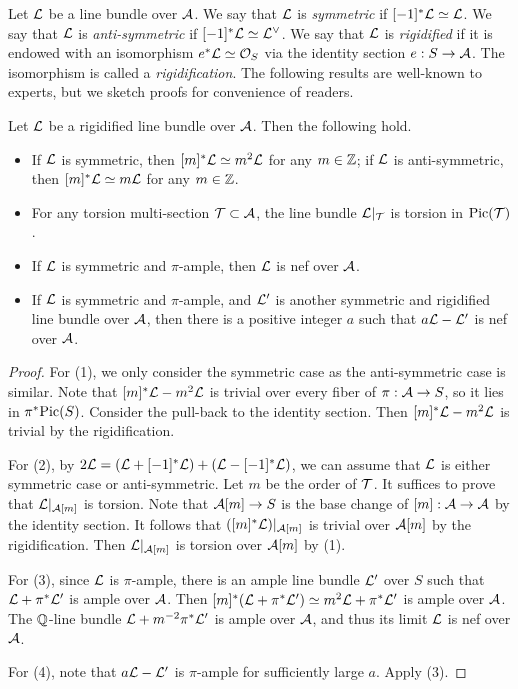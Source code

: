 Let ${\mathcal L}$ be a line bundle over ${\mathcal A}$.
We say that ${\mathcal L}$ is \emph{symmetric} if $[-1]^*{\mathcal L}\simeq {\mathcal L}$.
We say that ${\mathcal L}$ is \emph{anti-symmetric} if $[-1]^*{\mathcal L}\simeq {\mathcal L}^\vee$.
We say that ${\mathcal L}$ is \emph{rigidified} if it is endowed with an isomorphism $e^*{\mathcal L}\simeq {\mathcal O}_S$ via the identity section $e:S\to {\mathcal A}$. The isomorphism is called a \emph{rigidification}.
The following results are well-known to experts, but we sketch proofs for convenience of readers.

\begin{lemma}
\notready \label{line bundle}
Let ${\mathcal L}$ be a rigidified line bundle over ${\mathcal A}$.
Then the following hold.
\begin{itemize}
\item[(1)] If ${\mathcal L}$ is symmetric, then $[m]^*{\mathcal L}\simeq m^2{\mathcal L}$ for any $m\in {\mathbb Z}$; if ${\mathcal L}$ is anti-symmetric, then $[m]^*{\mathcal L}\simeq m{\mathcal L}$ for any $m\in {\mathbb Z}$.
\item[(2)] For any torsion multi-section ${\mathcal T}\subset {\mathcal A}$, the line bundle ${\mathcal L}|_{{\mathcal T}}$ is torsion in ${\rm Pic}({\mathcal T})$.
\item[(3)] If ${\mathcal L}$ is symmetric and $\pi$-ample, then ${\mathcal L}$ is nef over ${\mathcal A}$.
\item[(4)] If ${\mathcal L}$ is symmetric and $\pi$-ample, and ${\mathcal L}'$ is another symmetric and rigidified line bundle over ${\mathcal A}$, then there is a positive integer $a$ such that $a{\mathcal L}-{\mathcal L}'$ is nef over ${\mathcal A}$.
\end{itemize}
\end{lemma}

\begin{proof}
For (1), we only consider the symmetric case as the anti-symmetric case is similar.
Note that $[m]^*{\mathcal L}- m^2{\mathcal L}$ is trivial over every fiber of $\pi:{\mathcal A}\to S$, so it lies in $\pi^*{\rm Pic}(S)$. Consider the pull-back to the identity section. Then $[m]^*{\mathcal L}- m^2{\mathcal L}$ is trivial by the rigidification.

For (2), by $2{\mathcal L}=({\mathcal L}+[-1]^*{\mathcal L})+({\mathcal L}-[-1]^*{\mathcal L})$, we can assume that ${\mathcal L}$ is either symmetric case or anti-symmetric. Let $m$ be the order of ${\mathcal T}$. It suffices to prove that ${\mathcal L}|_{{\mathcal A}[m]}$ is torsion. Note that ${\mathcal A}[m]\to S$ is the base change of $[m]:{\mathcal A}\to {\mathcal A}$ by the identity section.
It follows that $([m]^*{\mathcal L})|_{{\mathcal A}[m]}$ is trivial over ${\mathcal A}[m]$ by the rigidification.
Then ${\mathcal L}|_{{\mathcal A}[m]}$ is torsion over ${\mathcal A}[m]$ by (1).

For (3), since ${\mathcal L}$ is $\pi$-ample, there is an ample line bundle ${\mathcal L}'$ over $S$ such that ${\mathcal L}+\pi^*{\mathcal L}'$ is ample over ${\mathcal A}$.
Then $[m]^*({\mathcal L}+\pi^*{\mathcal L}')\simeq m^2{\mathcal L}+\pi^*{\mathcal L}'$ is ample over ${\mathcal A}$.
The ${\mathbb Q}$-line bundle ${\mathcal L}+m^{-2}\pi^*{\mathcal L}'$ is ample over ${\mathcal A}$, and thus its limit ${\mathcal L}$ is nef over ${\mathcal A}$.

For (4), note that $a{\mathcal L}-{\mathcal L}'$ is $\pi$-ample for sufficiently large $a$. Apply (3).
\end{proof}



